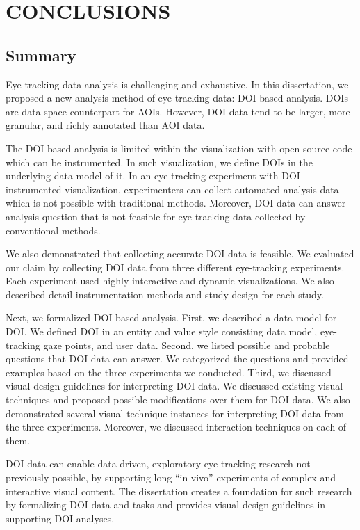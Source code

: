 \chapter{CONCLUSIONS}
\label{chap:Conclusion}
\section{Summary}
Eye-tracking data analysis is challenging and exhaustive. In this dissertation, we proposed a new analysis method of eye-tracking data: DOI-based analysis. DOIs are data space counterpart for AOIs. However, DOI data tend to be larger, more granular, and richly annotated than AOI data. 

The DOI-based analysis is limited within the visualization with open source code which can be instrumented. In such visualization, we define DOIs in the underlying data model of it. In an eye-tracking experiment with DOI instrumented visualization, experimenters can collect automated analysis data which is not possible with traditional methods. Moreover, DOI data can answer analysis question that is not feasible for eye-tracking data collected by conventional methods. 

We also demonstrated that collecting accurate DOI data is feasible. We evaluated our claim by collecting DOI data from three different eye-tracking experiments. Each experiment used highly interactive and dynamic visualizations. We also described detail instrumentation methods and study design for each study.

Next, we formalized DOI-based analysis. First, we described a data model for DOI. We defined DOI in an entity and value style consisting data model, eye-tracking gaze points, and user data. Second, we listed possible and probable questions that DOI data can answer. We categorized the questions and provided examples based on the three experiments we conducted. Third, we discussed visual design guidelines for interpreting DOI data. We discussed existing visual techniques and proposed possible modifications over them for DOI data. We also demonstrated several visual technique instances for interpreting DOI data from the three experiments. Moreover, we discussed interaction techniques on each of them.

DOI data can enable data-driven, exploratory eye-tracking research not previously possible, by supporting long ``in vivo'' experiments of complex and interactive visual content. The dissertation creates a foundation for such research by formalizing DOI data and tasks and provides visual design guidelines in supporting DOI analyses.

